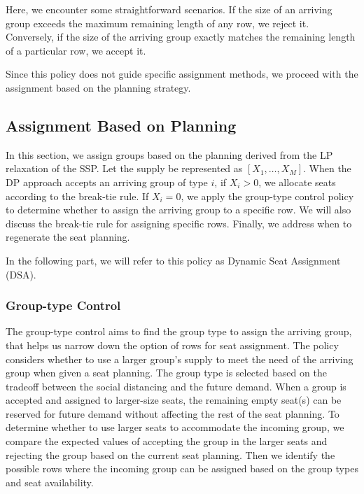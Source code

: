 Here, we encounter some straightforward scenarios. If the size of an arriving group exceeds the maximum remaining length of any row, we reject it. Conversely, if the size of the arriving group exactly matches the remaining length of a particular row, we accept it.

Since this policy does not guide specific assignment methods, we proceed with the assignment based on the planning strategy.

\subsection{Assignment Based on Planning}
In this section, we assign groups based on the planning derived from the LP relaxation of the SSP. Let the supply be represented as $[X_1, \ldots, X_M]$. When the DP approach accepts an arriving group of type $i$, if $X_{i} > 0$, we allocate seats according to the break-tie rule. If $X_{i} = 0$, we apply the group-type control policy to determine whether to assign the arriving group to a specific row. We will also discuss the break-tie rule for assigning specific rows. Finally, we address when to regenerate the seat planning.

In the following part, we will refer to this policy as Dynamic Seat Assignment (DSA).


\subsubsection{Group-type Control}\label{nested_policy}
The group-type control aims to find the group type to assign the arriving group, that helps us narrow down the option of rows for seat assignment. The policy considers whether to use a larger group's supply to meet the need of the arriving group when given a seat planning. The group type is selected based on the tradeoff between the social distancing and the future demand. When a group is accepted and assigned to larger-size seats, the remaining empty seat(s) can be reserved for future demand without affecting the rest of the seat planning. To determine whether to use larger seats to accommodate the incoming group, we compare the expected values of accepting the group in the larger seats and rejecting the group based on the current seat planning. Then we identify the possible rows where the incoming group can be assigned based on the group types and seat availability.

